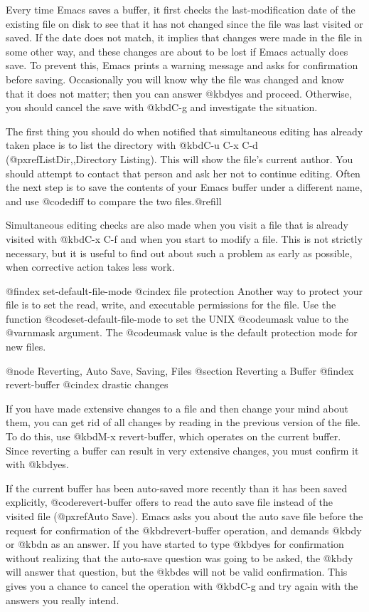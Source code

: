 {{{{{{{{{{{{{{{{{  Every time Emacs saves a buffer, it first checks the last-modification
date of the existing file on disk to see that it has not changed since the
file was last visited or saved.  If the date does not match, it implies
that changes were made in the file in some other way, and these changes are
about to be lost if Emacs actually does save.  To prevent this, Emacs
prints a warning message and asks for confirmation before saving.
Occasionally you will know why the file was changed and know that it does
not matter; then you can answer @kbd{yes} and proceed.  Otherwise, you should
cancel the save with @kbd{C-g} and investigate the situation.

  The first thing you should do when notified that simultaneous editing
has already taken place is to list the directory with @kbd{C-u C-x C-d}
(@pxref{ListDir,,Directory Listing}).  This will show the file's current
author.  You should attempt to contact that person and ask her not to
continue editing.  Often the next step is to save the contents of your
Emacs buffer under a different name, and use @code{diff} to compare the
two files.@refill

  Simultaneous editing checks are also made when you visit a file that
is already visited with @kbd{C-x C-f} and when you start to modify a
file.  This is not strictly necessary, but it is useful to find out
about such a problem as early as possible, when corrective action takes
less work.

@findex set-default-file-mode
@cindex file protection
Another way to protect your file is to set the read, write, and
executable permissions for the file. Use the function
@code{set-default-file-mode} to set the UNIX @code{umask} value to the
@var{nmask} argument. The @code{umask} value is the default protection
mode for new files.

@node Reverting, Auto Save, Saving, Files
@section Reverting a Buffer
@findex revert-buffer
@cindex drastic changes

  If you have made extensive changes to a file and then change your mind
about them, you can get rid of all changes by reading in the previous
version of the file.  To do this, use @kbd{M-x revert-buffer}, which
operates on the current buffer.  Since reverting a buffer can result in
very extensive changes, you must confirm it with @kbd{yes}.

  If the current buffer has been auto-saved more recently than it has been
saved explicitly, @code{revert-buffer} offers to read the auto save file
instead of the visited file (@pxref{Auto Save}).  Emacs asks you about
the auto save file before the request for confirmation of the
@kbd{revert-buffer} operation, and demands @kbd{y} or @kbd{n}
as an answer.  If you have started to type @kbd{yes} for confirmation
without realizing that the auto-save question was going to be asked, the
@kbd{y} will answer that question, but the @kbd{es} will not be valid
confirmation.  This gives you a chance to cancel the operation with
@kbd{C-g} and try again with the answers you really intend.

}}}}}}}}}}}}}}}}}
